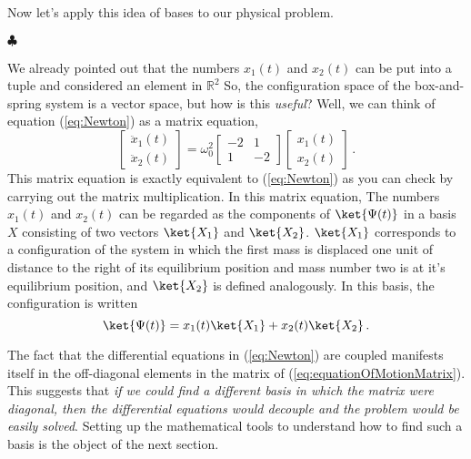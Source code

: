 \noindent Now let's apply this idea of bases to our physical problem.
\begin{flushleft} $\clubsuit$ \end{flushleft}
We already pointed out that the numbers $x_1(t)$ and $x_2(t)$ can be put into a tuple and considered an element in $\mathbb{R}^2$
So, the configuration space of the box-and-spring system is a vector space, but how is this \emph{useful}?
Well, we can think of equation (\ref{eq:Newton}) as a matrix equation,
\begin{equation} \label{eq:equationOfMotionMatrix}
\left[ \begin{array}{c} \ddot{x}_1(t) \\ \ddot{x}_2(t) \end{array} \right] = \omega^{2}_{0}\left[ \begin{array}{cc} -2 & 1 \\ 1 & -2 \end{array} \right] \left[ \begin{array}{c} x_{1}(t) \\ x_{2}(t) \end{array} \right] \, .
\end{equation}
This matrix equation is exactly equivalent to (\ref{eq:Newton}) as you can check by carrying out the matrix multiplication.
In this matrix equation, The numbers $x_1(t)$ and $x_2(t)$ can be regarded as the components of $\ket{\Psi (t)}$ in a basis $X$ consisting of two vectors $\ket{X_1}$ and $\ket{X_2}$.
$\ket{X_1}$ corresponds to a configuration of the system in which the first mass is displaced one unit of distance to the right of its equilibrium position and mass number two is at it's equilibrium position, and $\ket{X_2}$ is defined analogously.
In this basis, the configuration is written
\begin{equation} \label{eq:Psirep2}
\ket{\Psi (t)} = x_{1}(t)\ket{X_1} + x_{2}(t)\ket{X_2} \, .
\end{equation}

The fact that the differential equations in (\ref{eq:Newton}) are coupled manifests itself in the off-diagonal elements in the matrix of (\ref{eq:equationOfMotionMatrix}).
This suggests that \emph{if we could find a different basis in which the matrix were diagonal, then the differential equations would decouple and the problem would be easily solved}.
Setting up the mathematical tools to understand how to find such a basis is the object of the next section.

